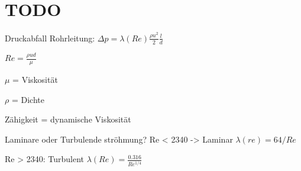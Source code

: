 \documentclass[a4paper]{scrartcl}
\begin{document}
\section{TODO}


Druckabfall Rohrleitung: $\Delta p = \lambda(Re) \frac{\rho u^2}{2}\frac{l}{d}$

$Re = \frac{\rho u d}{\mu}$

$\mu$ = Viskosität

$\rho$ = Dichte

Zähigkeit = dynamische Viskosität


Laminare oder Turbulende ströhmung? 
Re < 2340 -> Laminar
	$\lambda(re) = 64/Re$
	
Re > 2340: Turbulent
	$\lambda(Re) = \frac{0.316}{Re^{1/4}}$
\end{document}
